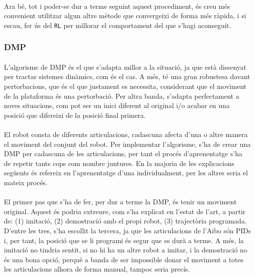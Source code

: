 \documentclass[12pt,a4paper,final,twoside]{article}
\begin{document}
\paragraph{}Ara bé, tot i poder-se dur a terme seguint aquest procediment, és creu més convenient utilitzar algun altre mètode que convergeixi de forma més ràpida, i si escau, fer ús del \texttt{RL} per millorar el comportament del que s'hagi aconseguit.

\subsubsection{DMP}
\paragraph{}L'algorisme de DMP és el que s'adapta millor a la situació, ja que està dissenyat per tractar sistemes dinàmics, com és el cas. A més, té una gran robustesa davant pertorbacions, que és el que justament es necessita, considerant que el moviment de la plataforma és una pertorbació. Per altra banda, s'adapta perfectament a noves situacions, com pot ser un inici diferent al original i/o acabar en una posició que difereixi de la posició final primera.

\paragraph{}El robot consta de diferents articulacions, cadascuna afecta d'una o altre manera el moviment del conjunt del robot. Per implementar l'algorisme, s'ha de crear una DMP per cadascuna de les articulacions, per tant el procés d'aprenentatge s'ha de repetir tants cops com nombre juntures. En la majoria de les explicacions següents és refereix en l'aprenentatge d'una individualment, per les altres seria el mateix procés.

\paragraph{}El primer pas que s'ha de fer, per dur a terme la DMP, és tenir un moviment original. Aquest és podria extreure, com s'ha explicat en l'estat de l'art, a partir de: (1) imitació, (2) demostració amb el propi robot, (3) trajectòria programada. D'entre les tres, s'ha escollit la tercera, ja que les articulacions de l'Aibo són PIDs i, per tant, la posició que se li programi és segur que es durà a terme. A més, la imitació no tindria sentit, si no hi ha un altre robot a imitar, i la demostració no és una bona opció, perquè a banda de ser impossible donar el moviment a totes les articulacions alhora de forma manual, tampoc seria precís.
\end{document}
